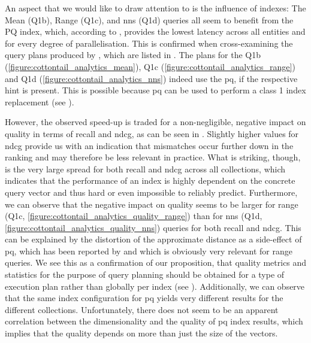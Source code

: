 An aspect that we would like to draw attention to is the influence of indexes: The Mean (Q1b), Range (Q1c), and \acrshort{nns} (Q1d) queries all seem to benefit from the PQ index, which, according to , provides the lowest latency across all entities and for every degree of parallelisation. This is confirmed when cross-examining the query plans produced by \cottontail{}, which are listed in . The plans for the Q1b (\ref{figure:cottontail_analytics_mean}), Q1c (\ref{figure:cottontail_analytics_range}) and Q1d (\ref{figure:cottontail_analytics_nns}) indeed use the \acrshort{pq}, if the respective hint is present. This is possible because \acrshort{pq} can be used to perform a class 1 index replacement (see ). 

However, the observed speed-up is traded for a non-negligible, negative impact on quality in terms of recall and \acrshort{ndcg}, as can be seen in . Slightly higher values for \acrshort{ndcg} provide us with an indication that mismatches occur further down in the ranking and may therefore be less relevant in practice. What is striking, though, is the very large spread for both recall and \acrshort{ndcg} across all collections, which indicates that the performance of an index is highly dependent on the concrete query vector and thus hard or even impossible to reliably predict. Furthermore, we can observe that the negative impact on quality seems to be larger for range (Q1c, \ref{figure:cottontail_analytics_quality_range}) than for \acrshort{nns} (Q1d, \ref{figure:cottontail_analytics_quality_nns}) queries for both recall and \acrshort{ndcg}. This can be explained by the distortion of the approximate distance as a side-effect of \acrshort{pq}, which has been reported by \cite{Jegou:2010Product} and which is obviously very relevant for range queries. We see this as a confirmation of our proposition, that quality metrics and statistics for the purpose of query planning should be obtained for a type of execution plan rather than globally per index (see ). Additionally, we can observe that the same index configuration for \acrshort{pq} yields very different results for the different collections. Unfortunately, there does not seem to be an apparent correlation between the dimensionality and the quality of \acrshort{pq} index results, which implies that the quality depends on more than just the size of the vectors.

